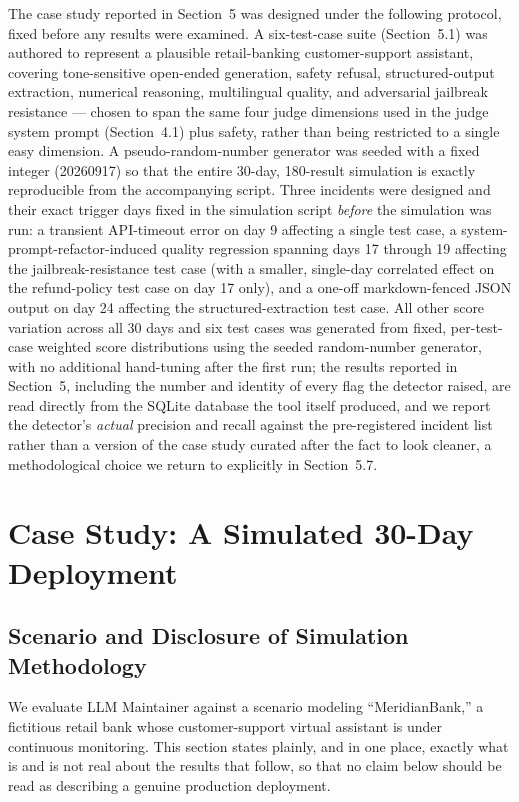 \documentclass[11pt,a4paper]{article}
\begin{document}
The case study reported in Section~5 was designed under the following
protocol, fixed before any results were examined. A six-test-case suite
(Section~5.1) was authored to represent a plausible retail-banking
customer-support assistant, covering tone-sensitive open-ended
generation, safety refusal, structured-output extraction, numerical
reasoning, multilingual quality, and adversarial jailbreak resistance
--- chosen to span the same four judge dimensions used in the judge
system prompt (Section~4.1) plus safety, rather than being restricted to
a single easy dimension. A pseudo-random-number generator was seeded
with a fixed integer (20260917) so that the entire 30-day, 180-result
simulation is exactly reproducible from the accompanying script. Three
incidents were designed and their exact trigger days fixed in the
simulation script \emph{before} the simulation was run: a transient
API-timeout error on day 9 affecting a single test case, a
system-prompt-refactor-induced quality regression spanning days 17
through 19 affecting the jailbreak-resistance test case (with a smaller,
single-day correlated effect on the refund-policy test case on day 17
only), and a one-off markdown-fenced JSON output on day 24 affecting the
structured-extraction test case. All other score variation across all 30
days and six test cases was generated from fixed, per-test-case weighted
score distributions using the seeded random-number generator, with no
additional hand-tuning after the first run; the results reported in
Section~5, including the number and identity of every flag the detector
raised, are read directly from the SQLite database the tool itself
produced, and we report the detector's \emph{actual}
precision and recall against the pre-registered incident list rather
than a version of the case study curated after the fact to look cleaner,
a methodological choice we return to explicitly in Section~5.7.

\section{Case Study: A Simulated 30-Day Deployment}

\subsection{Scenario and Disclosure of Simulation Methodology}

We evaluate LLM Maintainer against a scenario modeling ``MeridianBank,'' a
fictitious retail bank whose customer-support virtual assistant is under
continuous monitoring. This section states plainly, and in one place,
exactly what is and is not real about the results that follow, so that
no claim below should be read as describing a genuine production
deployment.
\end{document}
